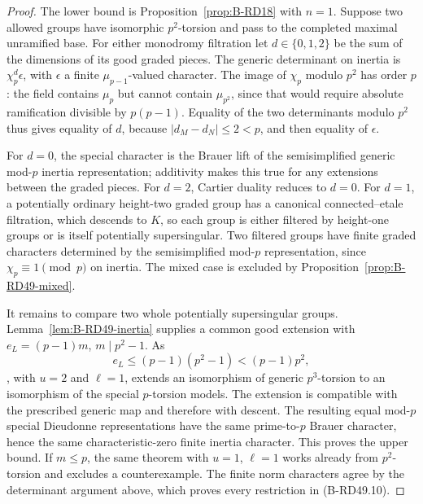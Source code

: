 \begin{proof}
The lower bound is Proposition~\ref{prop:B-RD18} with $n=1$.
Suppose two allowed groups have isomorphic $p^2$-torsion and
pass to the completed maximal unramified base. For either
monodromy filtration let $d\in\{0,1,2\}$ be the sum of the
dimensions of its good graded pieces. The generic determinant
on inertia is $\chi_p^d\epsilon$, with $\epsilon$ a finite
$\mu_{p-1}$-valued character. The image of $\chi_p$ modulo
$p^2$ has order $p$: the field contains $\mu_p$ but cannot
contain $\mu_{p^2}$, since that would require absolute
ramification divisible by $p(p-1)$. Equality of the two
determinants modulo $p^2$ thus gives equality of $d$, because
$|d_M-d_N|\leq2<p$, and then equality of $\epsilon$.

For $d=0$, the special character is the Brauer lift of the
semisimplified generic mod-$p$ inertia representation;
additivity makes this true for any extensions between the
graded pieces. For $d=2$, Cartier duality reduces to $d=0$.
For $d=1$, a potentially ordinary height-two graded group has
a canonical connected--etale filtration, which descends to
$K$, so each group is either filtered by height-one groups or
is itself potentially supersingular. Two filtered groups have
finite graded characters determined by the semisimplified
mod-$p$ representation, since $\chi_p\equiv1\pmod p$ on
inertia. The mixed case is excluded by
Proposition~\ref{prop:B-RD49-mixed}.

It remains to compare two whole potentially supersingular
groups. Lemma~\ref{lem:B-RD49-inertia} supplies a common good
extension with $e_L=(p-1)m$, $m\mid p^2-1$. As
\[
                     e_L\leq(p-1)(p^2-1)<(p-1)p^2,
\]
\cite[Theorem~E(1), pp.663--664; Proposition~18 and the full
proof of Theorem~E, p.685]{Bondarko2006Generic}, with $u=2$
and $\ell=1$, extends an isomorphism of generic $p^3$-torsion
to an isomorphism of the special $p$-torsion models. The
extension is compatible with the prescribed generic map and
therefore with descent. The resulting equal mod-$p$ special
Dieudonne representations have the same prime-to-$p$ Brauer
character, hence the same characteristic-zero finite inertia
character. This proves the upper bound. If $m\leq p$, the
same theorem with $u=1$, $\ell=1$ works already from
$p^2$-torsion and excludes a counterexample. The finite
norm characters agree by the determinant argument above,
which proves every restriction in (B-RD49.10).
\end{proof}

